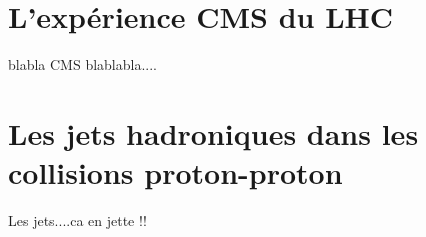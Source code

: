 \label{chap:premierchapitre}

\section{L'expérience CMS du LHC}

blabla CMS blablabla....

%  

\section{Les jets hadroniques dans les collisions proton-proton}

Les jets....ca en jette !!



